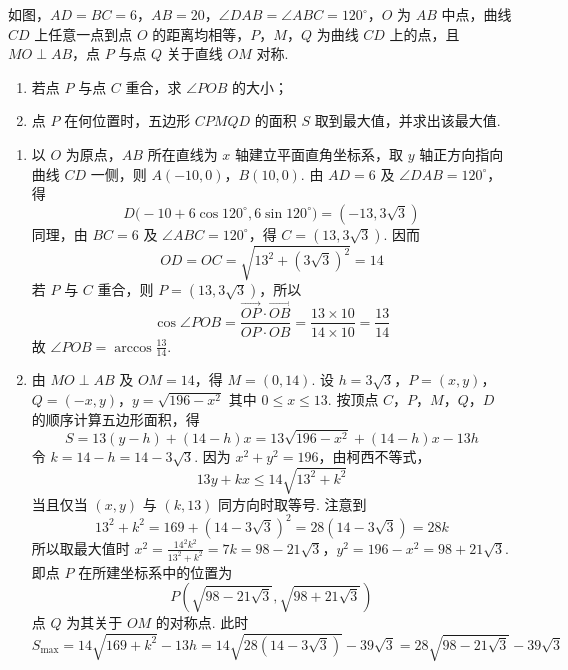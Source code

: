 \begin{problem}
如图，\(AD=BC=6\)，\(AB=20\)，\(\angle DAB=\angle ABC=120^\circ\)，\(O\) 为 \(AB\) 中点，曲线 \(CD\) 上任意一点到点 \(O\) 的距离均相等，\(P\)，\(M\)，\(Q\) 为曲线 \(CD\) 上的点，且 \(MO\perp AB\)，点 \(P\) 与点 \(Q\) 关于直线 \(OM\) 对称.
\begin{enumerate}
\item 若点 \(P\) 与点 \(C\) 重合，求 \(\angle POB\) 的大小；
\item 点 \(P\) 在何位置时，五边形 \(CPMQD\) 的面积 \(S\) 取到最大值，并求出该最大值.
\end{enumerate}

\end{problem}

\begin{solution}
\begin{enumerate}
\item 以 \(O\) 为原点，\(AB\) 所在直线为 \(x\) 轴建立平面直角坐标系，取 \(y\) 轴正方向指向曲线 \(CD\) 一侧，则
\(A(-10,0)\)，\(B(10,0)\).
由 \(AD=6\) 及 \(\angle DAB=120^\circ\)，得
\[
D\bigl(-10+6\cos120^\circ,6\sin120^\circ\bigr)=(-13,3\sqrt3)
\]
同理，由 \(BC=6\) 及 \(\angle ABC=120^\circ\)，得 \(C=(13,3\sqrt3)\). 因而
\[
OD=OC=\sqrt{13^2+(3\sqrt3)^2}=14
\]
若 \(P\) 与 \(C\) 重合，则 \(P=(13,3\sqrt3)\)，所以
\[
\cos\angle POB=\frac{\overrightarrow{OP}\cdot\overrightarrow{OB}}{OP\cdot OB}=\frac{13\times10}{14\times10}=\frac{13}{14}
\]
故 \(\angle POB=\arccos\frac{13}{14}\).

\item 由 \(MO\perp AB\) 及 \(OM=14\)，得 \(M=(0,14)\). 设
\(h=3\sqrt3\)，\(P=(x,y)\)，\(Q=(-x,y)\)，\(y=\sqrt{196-x^2}\)
其中 \(0\le x\le13\). 按顶点 \(C\)，\(P\)，\(M\)，\(Q\)，\(D\) 的顺序计算五边形面积，得
\[
S=13(y-h)+(14-h)x=13\sqrt{196-x^2}+(14-h)x-13h
\]
令 \(k=14-h=14-3\sqrt3\). 因为 \(x^2+y^2=196\)，由柯西不等式，
\[
13y+kx\le14\sqrt{13^2+k^2}
\]
当且仅当 \((x,y)\) 与 \((k,13)\) 同方向时取等号. 注意到
\[
13^2+k^2=169+(14-3\sqrt3)^2=28(14-3\sqrt3)=28k
\]
所以取最大值时
\(x^2=\frac{14^2k^2}{13^2+k^2}=7k=98-21\sqrt3\)，\(y^2=196-x^2=98+21\sqrt3\).
即点 \(P\) 在所建坐标系中的位置为
\[
P\left(\sqrt{98-21\sqrt3},\sqrt{98+21\sqrt3}\right)
\]
点 \(Q\) 为其关于 \(OM\) 的对称点. 此时
\[
S_{\max}=14\sqrt{169+k^2}-13h=14\sqrt{28(14-3\sqrt3)}-39\sqrt3=28\sqrt{98-21\sqrt3}-39\sqrt3
\]
\end{enumerate}
\end{solution}

